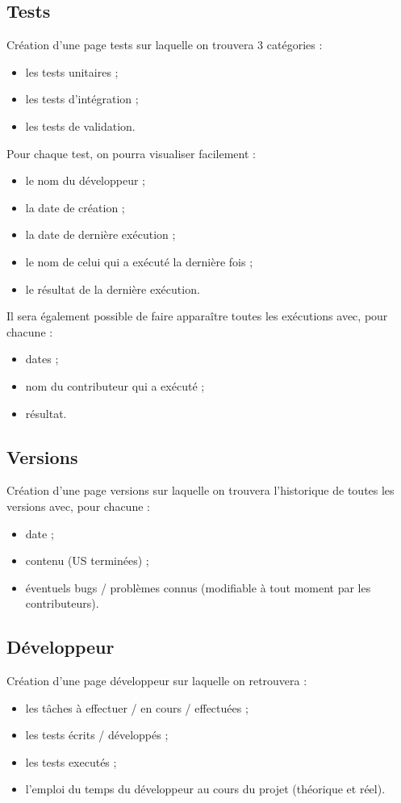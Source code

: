 \subsection{Tests}
Cr\'eation d'une page \og{}tests\fg{}\label{test} sur laquelle on trouvera 3 cat\'egories :
\begin{itemize}
\item les tests unitaires ;
\item les tests d'int\'egration ;
\item les tests de validation.
\end{itemize}
Pour chaque test, on pourra visualiser facilement :
\begin{itemize}
\item le nom du d\'eveloppeur ;
\item la date de cr\'eation ;
\item la date de derni\`ere ex\'ecution ;
\item le nom de celui qui a ex\'ecut\'e la derni\`ere fois ;
\item le r\'esultat de la derni\`ere ex\'ecution.
\end{itemize}
Il sera \'egalement possible de faire appara\^itre toutes les ex\'ecutions avec, pour chacune :
\begin{itemize}
\item dates ;
\item nom du contributeur qui a ex\'ecut\'e ;
\item r\'esultat.
\end{itemize}

\subsection{Versions}
Cr\'eation d'une page \og{}versions\fg{} sur laquelle on trouvera l'historique de toutes les versions avec, pour chacune :
\begin{itemize}
\item date ;
\item contenu (US termin\'ees) ;
\item \'eventuels bugs / probl\`emes connus (modifiable \`a tout moment par les contributeurs).
\end{itemize}

\subsection{D\'eveloppeur}
Cr\'eation d'une page \og{}d\'eveloppeur\fg{} sur laquelle on retrouvera :
\begin{itemize}
\item les t\^aches \`a effectuer / en cours / effectu\'ees ;
\item les tests \'ecrits / d\'evelopp\'es ;
\item les tests execut\'es ;
\item l'emploi du temps du d\'eveloppeur au cours du projet (th\'eorique et r\'eel).
\end{itemize}

